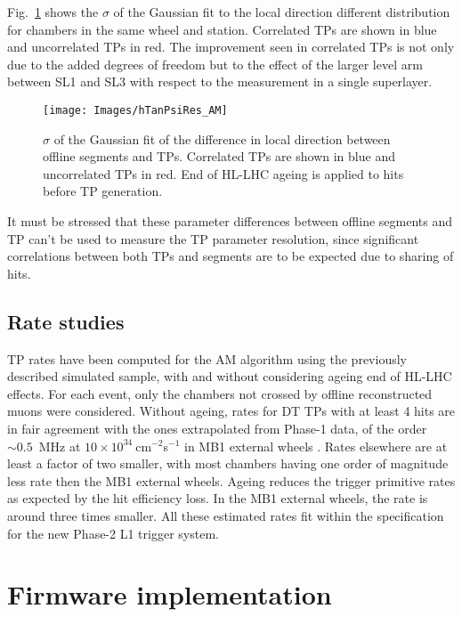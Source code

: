 \documentclass[../main.tex]{subfiles}
\begin{document}
Fig.~\ref{dts:fig:tanpsi_summary} shows the $\sigma$ of the Gaussian fit to the local direction different distribution for chambers in the same wheel and station. Correlated TPs are shown in blue and uncorrelated TPs in red. The improvement seen in correlated TPs is not only due to the added degrees of freedom but to the effect of the larger level arm between SL1 and SL3 with respect to the measurement in a single superlayer.


\begin{figure}[h!]
\begin{center}
\texttt{[image: Images/hTanPsiRes\_AM]}
\end{center}
\caption{$\sigma$ of the Gaussian fit of the difference in local direction between offline segments and TPs. Correlated TPs are shown in blue and uncorrelated TPs in red. End of HL-LHC ageing is applied to hits before TP generation.}
\label{dts:fig:tanpsi_summary}
\end{figure}

It must be stressed that these parameter differences between offline segments and TP can't be used to measure the TP parameter resolution, since significant correlations between both TPs and segments are to be expected due to sharing of hits.



\subsection{Rate studies}

TP rates have been computed for the AM algorithm using the previously described simulated sample, with and without considering ageing end of HL-LHC effects. For each event, only the chambers not crossed by offline reconstructed muons were considered. Without ageing, rates for DT TPs with at least 4 hits are in fair agreement with the ones extrapolated from Phase-1 data, of the order $\sim0.5$~MHz at $10\times10^{34}~$cm${}^{-2}$s${}^{-1}$ in MB1 external wheels \cite{muontdr}. Rates elsewhere are at least a factor of two smaller, with most chambers having one order of magnitude less rate then the MB1 external wheels. Ageing reduces the trigger primitive rates as expected by the hit efficiency loss. In the MB1 external wheels, the rate is around three times smaller. All these estimated rates fit within the specification for the new Phase-2 L1 trigger system.


\section{Firmware implementation}
\label{hh:sec:fw}
\end{document}
